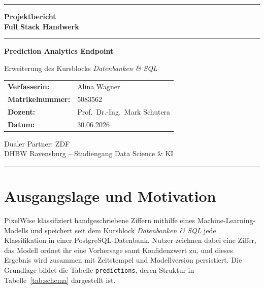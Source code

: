 \documentclass[12pt, a4paper]{article}
\begin{document}
\begin{titlepage}
  \centering
  \vspace*{1.5cm}
  {\color{dhbwred}\rule{\linewidth}{1.5pt}}\vspace{0.5cm}

  {\Huge\bfseries Projektbericht\\[0.4em]\large Full Stack Handwerk}

  \vspace{0.3cm}
  {\color{dhbwred}\rule{\linewidth}{1.5pt}}\vspace{1.5cm}

  {\LARGE\bfseries Prediction Analytics Endpoint}

  \vspace{0.8cm}
  {\large Erweiterung des Kursblocks \textit{Datenbanken \& SQL}}

  \vspace{2.5cm}
  \begin{tabular}{ll}
    \textbf{Verfasserin:}    & Alina Wagner \\[0.4em]
    \textbf{Matrikelnummer:} & 5083562 \\[0.4em]
    \textbf{Dozent:}         & Prof.\ Dr.-Ing.\ Mark Schutera \\[0.4em]
    \textbf{Datum:}          & 30.06.2026 \\
  \end{tabular}

  \vfill
  {\small Dualer Partner: ZDF \\ DHBW Ravensburg -- Studiengang Data Science \& KI}
  \vspace{1cm}
  {\color{dhbwred}\rule{\linewidth}{0.8pt}}
\end{titlepage}

\tableofcontents
\thispagestyle{fancy}
\newpage

\section{Ausgangslage und Motivation}

PixelWise klassifiziert handgeschriebene Ziffern mithilfe eines
Machine-Learning-Modells und speichert seit dem Kursblock
\textit{Datenbanken \& SQL} jede Klassifikation in einer
PostgreSQL-Datenbank. Nutzer zeichnen dabei eine Ziffer, das Modell
ordnet ihr eine Vorhersage samt Konfidenzwert zu, und dieses Ergebnis
wird zusammen mit Zeitstempel und Modellversion persistiert. Die
Grundlage bildet die Tabelle \texttt{predictions}, deren Struktur in
Tabelle~\ref{tab:schema} dargestellt ist.
\end{document}
